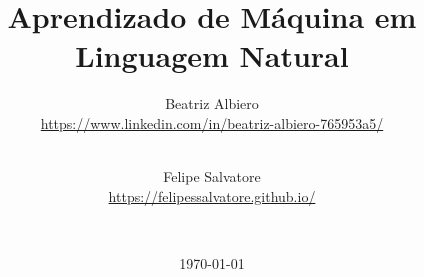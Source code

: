 \title{Aprendizado de Máquina em Linguagem Natural}
\date{\today}

\author{
  Beatriz Albiero\\
  \url{https://www.linkedin.com/in/beatriz-albiero-765953a5/}
  \vspace{0.1 cm}
  \and\\ 
  Felipe Salvatore\\
  \url{https://felipessalvatore.github.io/}
  \vspace{0.1 cm}
  \and\\
}


